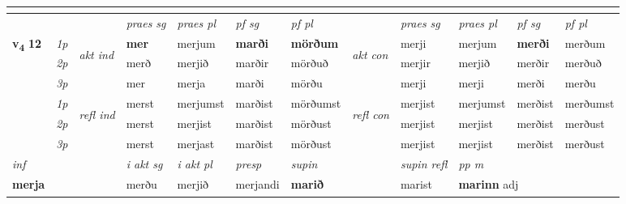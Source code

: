 \begin{longtable}[l]{X>{\footnotesize\itshape}llXXXXlXXXX}
\midrule
   & \\
   \midrule
 & &   & \textit{praes sg}  & \textit{praes pl}    & \textit{ pf sg} & \textit{pf pl} & & \textit{praes sg}  & \textit{praes pl}    & \textit{pf sg} & \textit{pf pl }  \\ \cmidrule{4-7} \cmidrule{9-12}
 \multirow{2}{*}{{{\textbf{v{\textsubscript{4}}} \Large{\textbf{12}}}}}  & 1p & \multirow{3}{*}{\begin{turn}{90}\textit{akt ind}\end{turn}} & \textbf{mer} & merjum & \textbf{marði} & \textbf{mörðum} & \multirow{3}{*}{\begin{turn}{90}\textit{akt con}\end{turn}} &merji & merjum & \textbf{merði} & merðum\\*
 & 2p &  &  merð  & merjið & marðir & mörðuð & & merjir & merjið & merðir & merðuð \\*
 & 3p &  & mer & merja & marði & mörðu & & merji & merji& merði & merðu \\*
\cmidrule{4-7} \cmidrule{9-12}
 & 1p & \multirow{3}{*}{\begin{turn}{90}\textit{refl ind}\end{turn}}  & merst & merjumst & marðist & mörðumst & \multirow{3}{*}{\begin{turn}{90}\textit{refl con}\end{turn}}  &merjist & merjumst & merðist & merðumst \\*
 & 2p &  & merst & merjist & marðist & mörðust & &merjist & merjist & merðist & merðust \\*
 & 3p  & & merst & merjast & marðist & mörðust & & merjist & merjist& merðist & merðust \\*
\cmidrule{4-7} \cmidrule{9-12}

   {\textit{inf}} & &  & \textit{i akt sg} & \textit{i akt pl}   & \textit{presp} & \textit{supin} && \textit{supin refl} & \textit{pp m} \\*
  {\textbf{merja}} & && merðu  & merjið   & merjandi &  \textbf{marið} && marist & \multicolumn{2}{l}{\textbf{marinn} adj\textbf{\textsubscript{}}} \\*

\midrule


\end{longtable}
